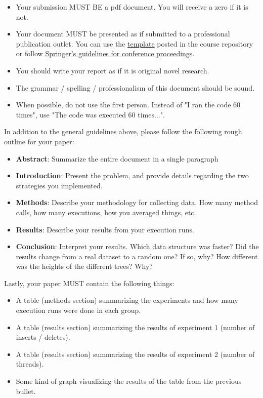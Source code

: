 \documentclass[paper=a4, fontsize=11pt, parskip=full]{scrartcl} %
\numberwithin{equation}{section} %
\numberwithin{figure}{section} %
\numberwithin{table}{section} %
\begin{document}
\begin{itemize}
	\item Your submission MUST BE a pdf document. You will receive a zero if it is not.
	\item Your document MUST be presented as if submitted to a professional publication outlet. You can use the \href{https://markfloryan.github.io/dsa1/labs/WordPaperTemplate.zip}{template} posted in the course repository or follow \href{https://www.springer.com/us/computer-science/lncs/conference-proceedings-guidelines}{Springer's guidelines for conference proceedings}.
	\item You should write your report as if it is original novel research.
	\item The grammar / spelling / professionalism of this document should be sound.
	\item When possible, do not use the first person. Instead of "I ran the code 60 times", use "The code was executed 60 times...".
\end{itemize}

In addition to the general guidelines above, please follow the following rough outline for your paper:

\begin{itemize}
	\item \textbf{Abstract}: Summarize the entire document in a single paragraph
	\item \textbf{Introduction}: Present the problem, and provide details regarding the two strategies you implemented.
	\item \textbf{Methods}: Describe your methodology for collecting data. How many method calls, how many executions, how you averaged things, etc.
	\item \textbf{Results}: Describe your results from your execution runs.
	\item \textbf{Conclusion}: Interpret your results. Which data structure was faster? Did the results change from a real dataset to a random one? If so, why? How different was the heights of the different trees? Why?
\end{itemize}

Lastly, your paper MUST contain the following things:

\begin{itemize}
	\item A table (methods section) summarizing the experiments and how many execution runs were done in each group.
	\item A table (results section) summarizing the results of experiment 1 (number of inserts / deletes).
	\item A table (results section) summarizing the results of experiment 2 (number of threads).
	\item Some kind of graph visualizing the results of the table from the previous bullet.
\end{itemize}


\end{document}
